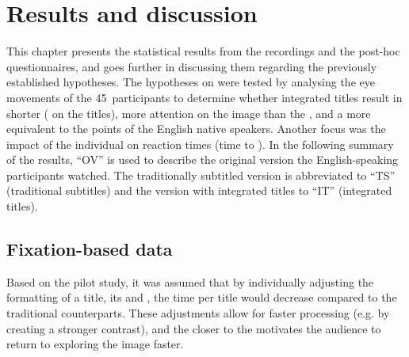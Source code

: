 \chapter{Results and discussion}\label{results}

This chapter presents the statistical results from the  recordings and the post-hoc questionnaires, and goes further in discussing them regarding the previously established hypotheses. The hypotheses on  were tested by analysing the eye movements of the 45~participants to determine whether integrated titles result in shorter  ( on the titles), more attention on the image than the , and a  more equivalent to the  points of the English native speakers. Another focus was the impact of the individual  on reaction times (time to ). In the following summary of the results, “OV” is used to describe the original version the English-speaking participants watched. The traditionally subtitled version is abbreviated to “TS” (traditional subtitles) and the version with integrated titles to “IT” (integrated titles).


\section{{Fixation-based data}}\label{sec:8.1}

Based on the pilot study, it was assumed that by individually adjusting the formatting of a title, its  and , the  time per title would decrease compared to the traditional counterparts. These adjustments allow for faster processing (e.g. by creating a stronger contrast), and the  closer to the  motivates the audience to return to exploring the image faster.



